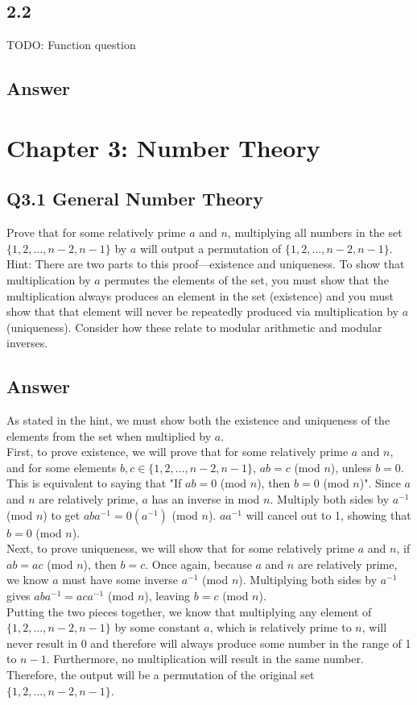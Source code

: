 \documentclass{article}
\begin{document}
\subsection*{2.2}
TODO: Function question
\subsection*{Answer}
\newpage
\section*{Chapter 3: Number Theory}
\subsection*{Q3.1 General Number Theory}
Prove that for some relatively prime $a$ and $n$, multiplying all numbers in the set $\{1,2,...,n-2,n-1\}$ by $a$ will output a permutation of $\{1,2,...,n-2,n-1\}$.
\\ Hint: There are two parts to this proof---existence and uniqueness. To show that multiplication by $a$ permutes the elements of the set, you must show that the multiplication always produces an element in the set (existence) and you must show that that element will never be repeatedly produced via multiplication by $a$ (uniqueness). Consider how these relate to modular arithmetic and modular inverses.
\newpage
\subsection*{Answer}
As stated in the hint, we must show both the existence and uniqueness of the elements from the set when multiplied by $a$.
\\ First, to prove existence, we will prove that for some relatively prime $a$ and $n$, and for some elements $b,c\in \{1,2,...,n-2,n-1\}$,  $ab=c$ (mod $n$), unless $b=0$. This is equivalent to saying that "If $ab=0$ (mod $n$), then $b=0$ (mod $n$)". Since $a$ and $n$ are relatively prime, $a$ has an inverse in mod $n$. Multiply both sides by $a^{-1}$ (mod $n$) to get $aba^{-1}=0(a^{-1})$ (mod $n$). $aa^{-1}$ will cancel out to 1, showing that $b=0$ (mod $n$).
\\ Next, to prove uniqueness, we will show that for some relatively prime $a$ and $n$, if $ab=ac$ (mod $n$), then $b=c$. Once again, because $a$ and $n$ are relatively prime, we know $a$ must have some inverse $a^{-1}$ (mod $n$). Multiplying both sides by $a^{-1}$ gives $aba^{-1}=aca^{-1}$ (mod $n$), leaving $b=c$ (mod $n$).
\\ Putting the two pieces together, we know that multiplying any element of $\{1,2,...,n-2,n-1\}$ by some constant $a$, which is relatively prime to $n$, will never result in 0 and therefore will always produce some number in the range of 1 to $n-1$. Furthermore, no multiplication will result in the same number. Therefore, the output will be a permutation of the original set $\{1,2,...,n-2,n-1\}$.
\newpage
\end{document}
